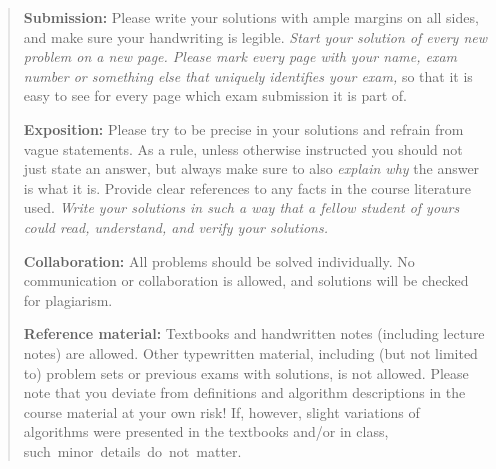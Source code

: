 
\begin{abstract}
%   
  \noindent
  \textbf{Submission:}
  Please write your solutions
  with
  ample margins on all
  sides, and make sure your handwriting is legible.
  \emph{Start your solution of every new problem on a new
    page. %
    Please mark every page
    with your name,
    exam number or something else that uniquely identifies your exam,}
  so that it is easy to see for every
  page
  which exam submission it is part of.
%   
%   

  \noindent
  \textbf{Exposition:}
  Please try to be precise
  in your solutions and
  refrain from vague statements.
  As a rule, unless otherwise instructed you should not just
  state an answer, but always make sure to
  also
  \emph{explain why} the answer is what it is.
  Provide clear references to any
  facts in the course literature used.
  \emph{Write your solutions in such a way that 
    a    %
    fellow
    student of yours could read, understand, and verify your
    solutions.}
%   
%   
    
  \noindent
  \textbf{Collaboration:}
  All problems should be solved individually. No communication or
  collaboration is allowed, and solutions will be checked for
  plagiarism.

  \noindent
  \textbf{Reference material:}
  Textbooks and handwritten notes (including lecture notes) are allowed.
%     
%     
  Other typewritten material, including (but not limited to) problem
  sets or previous exams with solutions,  is not allowed.
%     
%   
%     
  Please note that you deviate from definitions and
  algorithm descriptions
  in the course material at your own risk! If, however,
  slight variations of algorithms were presented in the textbooks
  and/or in class,
  \mbox{such minor details do not matter.} 


\end{abstract}
